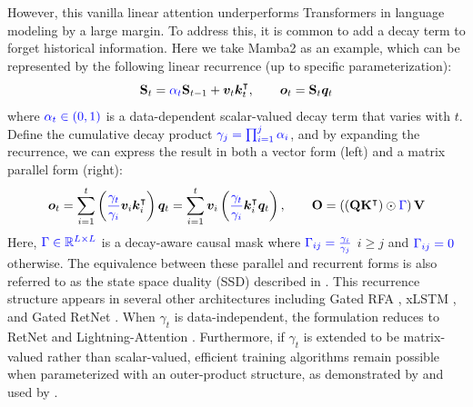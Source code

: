\documentclass{article}
\def\rmK{{\mathbf{K}}}
\def\rmO{{\mathbf{O}}}
\def\rmQ{{\mathbf{Q}}}
\def\rmS{{\mathbf{S}}}
\def\rmV{{\mathbf{V}}}
\def\vk{{\bm{k}}}
\def\vo{{\bm{o}}}
\def\vq{{\bm{q}}}
\def\vv{{\bm{v}}}
\begin{document}
However, this vanilla linear attention underperforms Transformers in language modeling by a large margin. To address this, it is common to add a decay term to forget historical information. Here we take Mamba2 \citep{mamba2} as an example, which can be represented by the following linear recurrence (up to specific parameterization):
\[
\rmS_t = {\color{blue}\alpha_t} \rmS_{t-1} + \vv_t \vk_t^\intercal, \qquad \vo_t = \rmS_t \vq_t
\]
where ${\color{blue}\alpha_t \in (0,1)}$ is a data-dependent scalar-valued decay term that varies with $t$.
Define the cumulative decay product $\color{blue}{\gamma_j = \prod_{i=1}^j \alpha_i}$, and by expanding the recurrence, we can express the result in both a vector form (left) and a matrix parallel form (right):
\[
\vo_t = \sum_{i=1}^t \left({ {\color{blue}\frac{\gamma_t}{\gamma_i}}} \vv_i \vk_i^\intercal  \right) \vq_t = \sum_{i=1}^t \vv_i \left( {\color{blue} \frac{\gamma_t}{\gamma_i}} \vk_i^\intercal \vq_t \right), \qquad 
\rmO = \left( \left(\rmQ \rmK^\intercal \right) \odot { {\color{blue}\Gamma}} \right) \rmV
\]
Here, ${\color{blue}\Gamma \in \mathbb{R}^{L\times L}}$ is a decay-aware causal mask where
$\color{blue}{\Gamma_{ij} = \frac{\gamma_i}{\gamma_j}}$   $i \ge j$ and ${\color{blue}\Gamma_{ij} = 0}$ otherwise.
The equivalence between these parallel and recurrent forms is also referred to as the state space duality (SSD) described in \citet{mamba2}. This recurrence structure appears in several other architectures including Gated RFA \citep{peng_random_2021}, xLSTM \citep{beck2024xlstm}, and Gated RetNet \citep{Sun2024YouOC}. When $\gamma_t$ is data-independent, the formulation reduces to RetNet \citep{sun2023retentive} and Lightning-Attention \citep{lightning2}. Furthermore, if $\gamma_t$ is extended to be matrix-valued rather than scalar-valued, efficient training algorithms remain possible when parameterized with an outer-product structure, as demonstrated by \citet{yang_gated_2023} and used by \citet{yang_gated_2023, peng_eagle_2024, qin2024hgrn2, Zhang2024GatedSA, chou2024metala,he2025rodimus,lu2025reglarefininggatedlinear}.
\end{document}
